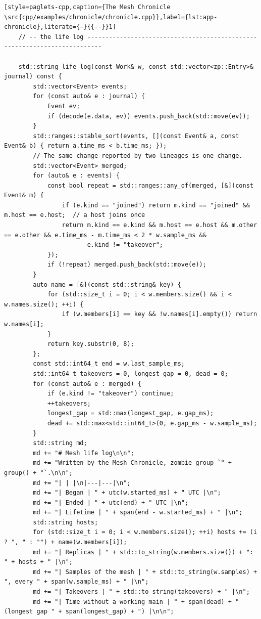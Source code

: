 \begin{lstlisting}[style=paglets-cpp,caption={The Mesh Chronicle \src{cpp/examples/chronicle/chronicle.cpp}},label={lst:app-chronicle},literate={–}{{--}}1]
    // -- the life log --------------------------------------------------------------------------

    std::string life_log(const Work& w, const std::vector<zp::Entry>& journal) const {
        std::vector<Event> events;
        for (const auto& e : journal) {
            Event ev;
            if (decode(e.data, ev)) events.push_back(std::move(ev));
        }
        std::ranges::stable_sort(events, [](const Event& a, const Event& b) { return a.time_ms < b.time_ms; });
        // The same change reported by two lineages is one change.
        std::vector<Event> merged;
        for (auto& e : events) {
            const bool repeat = std::ranges::any_of(merged, [&](const Event& m) {
                if (e.kind == "joined") return m.kind == "joined" && m.host == e.host;  // a host joins once
                return m.kind == e.kind && m.host == e.host && m.other == e.other && e.time_ms - m.time_ms < 2 * w.sample_ms &&
                       e.kind != "takeover";
            });
            if (!repeat) merged.push_back(std::move(e));
        }
        auto name = [&](const std::string& key) {
            for (std::size_t i = 0; i < w.members.size() && i < w.names.size(); ++i) {
                if (w.members[i] == key && !w.names[i].empty()) return w.names[i];
            }
            return key.substr(0, 8);
        };
        const std::int64_t end = w.last_sample_ms;
        std::int64_t takeovers = 0, longest_gap = 0, dead = 0;
        for (const auto& e : merged) {
            if (e.kind != "takeover") continue;
            ++takeovers;
            longest_gap = std::max(longest_gap, e.gap_ms);
            dead += std::max<std::int64_t>(0, e.gap_ms - w.sample_ms);
        }
        std::string md;
        md += "# Mesh life log\n\n";
        md += "Written by the Mesh Chronicle, zombie group `" + group() + "`.\n\n";
        md += "| | |\n|---|---|\n";
        md += "| Began | " + utc(w.started_ms) + " UTC |\n";
        md += "| Ended | " + utc(end) + " UTC |\n";
        md += "| Lifetime | " + span(end - w.started_ms) + " |\n";
        std::string hosts;
        for (std::size_t i = 0; i < w.members.size(); ++i) hosts += (i ? ", " : "") + name(w.members[i]);
        md += "| Replicas | " + std::to_string(w.members.size()) + ": " + hosts + " |\n";
        md += "| Samples of the mesh | " + std::to_string(w.samples) + ", every " + span(w.sample_ms) + " |\n";
        md += "| Takeovers | " + std::to_string(takeovers) + " |\n";
        md += "| Time without a working main | " + span(dead) + " (longest gap " + span(longest_gap) + ") |\n\n";


\end{lstlisting}
